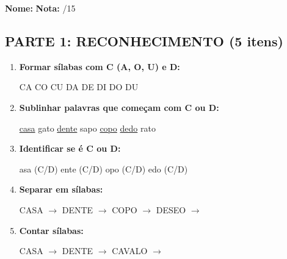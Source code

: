 \begin{exercicio}

\noindent\textbf{Nome:} \underline{\hspace{4cm}} \quad \textbf{Nota:} \underline{\hspace{1cm}}/15

\subsection*{PARTE 1: RECONHECIMENTO (5 itens)}

\begin{enumerate}
  \item \textbf{Formar sílabas com C (A, O, U) e D:}
  \begin{center}
  CA \quad CO \quad CU \quad DA \quad DE \quad DI \quad DO \quad DU
  \end{center}

  \item \textbf{Sublinhar palavras que começam com C ou D:}
  \begin{center}
  \uline{casa} \quad gato \quad \uline{dente} \quad sapo \quad \uline{copo} \quad \uline{dedo} \quad rato
  \end{center}

  \item \textbf{Identificar se é C ou D:}
  \begin{center}
  \underline{\hspace{0.5cm}}asa (C/D) \quad \underline{\hspace{0.5cm}}ente (C/D) \quad \underline{\hspace{0.5cm}}opo (C/D) \quad \underline{\hspace{0.5cm}}edo (C/D)
  \end{center}

  \item \textbf{Separar em sílabas:}
  \begin{center}
  CASA $\rightarrow$ \underline{\hspace{1.5cm}} \quad DENTE $\rightarrow$ \underline{\hspace{1.5cm}} \quad COPO $\rightarrow$ \underline{\hspace{1.5cm}} \quad DESEO $\rightarrow$ \underline{\hspace{1.5cm}}
  \end{center}

  \item \textbf{Contar sílabas:}
  \begin{center}
  CASA $\rightarrow$ \underline{\hspace{1cm}} \quad DENTE $\rightarrow$ \underline{\hspace{1cm}} \quad CAVALO $\rightarrow$ \underline{\hspace{1cm}}
  \end{center}
\end{enumerate}


\end{exercicio}
